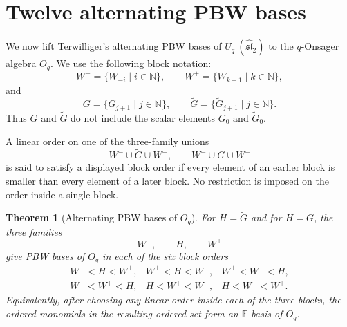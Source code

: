 \documentclass[11pt]{extarticle}
\newtheorem{theorem}{Theorem}[section]
\theoremstyle{definition}
\theoremstyle{remark}
\numberwithin{equation}{section}
\newcommand{\F}{\mathbb F}
\newcommand{\N}{\mathbb N}
\newcommand{\Oq}{O_q}
\newcommand{\Uplus}{U_q^+(\widehat{\mathfrak{sl}}_2)}
\begin{document}
\section{Twelve alternating PBW bases}
\label{sec:twelve}

We now lift Terwilliger's alternating PBW bases of \(\Uplus\) to the
\(q\)-Onsager algebra \(\Oq\).  We use the following block notation:
\[
 W^-=\{W_{-i}\mid i\in\N\},\qquad
 W^+=\{W_{k+1}\mid k\in\N\},
\]
and
\[
 G=\{G_{j+1}\mid j\in\N\},\qquad
 \widetilde G=\{\widetilde G_{j+1}\mid j\in\N\}.
\]
Thus \(G\) and \(\widetilde G\) do not include the scalar elements
\(G_0\) and \(\widetilde G_0\).

A linear order on one of the three-family unions
\[
        W^-\cup \widetilde G\cup W^+,
        \qquad
        W^-\cup G\cup W^+
\]
is said to satisfy a displayed block order if every element of an earlier
block is smaller than every element of a later block.  No restriction is
imposed on the order inside a single block.

\begin{theorem}[Alternating PBW bases of \(\Oq\)]
\label{thm:twelve-PBW}
For \(H=\widetilde G\) and for \(H=G\), the three families
\[
        W^-,\qquad H,\qquad W^+
\]
give PBW bases of \(\Oq\) in each of the six block orders
\begin{equation}
\label{eq:six-Oq-orders}
\begin{array}{lll}
W^-<H<W^+,&
W^+<H<W^-,&
W^+<W^-<H,\\[1mm]
W^-<W^+<H,&
H<W^+<W^-,&
H<W^-<W^+.
\end{array}
\end{equation}
Equivalently, after choosing any linear order inside each of the three
blocks, the ordered monomials in the resulting ordered set form an
\(\F\)-basis of \(\Oq\).
\end{theorem}
\end{document}
